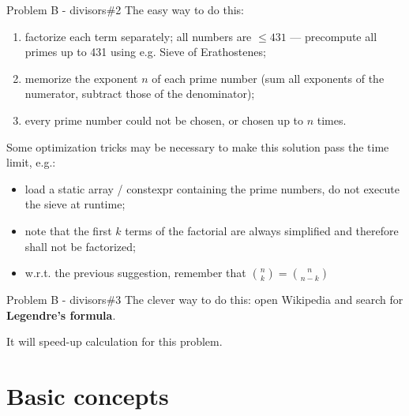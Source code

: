 \documentclass[compress]{beamer}
\begin{document}
\begin{frame}{Problem B - divisors}{\#2}
    The easy way to do this:
    \begin{enumerate}
        \item factorize each term separately; all numbers are $\leq 431$ --- precompute all primes up to 431 using e.g. Sieve of Erathostenes;
        \item memorize the exponent $n$ of each prime number (sum all exponents of the numerator, subtract those of the denominator);
        \item every prime number could not be chosen, or chosen up to $n$ times.
    \end{enumerate} \pause

    \medskip
    Some optimization tricks may be necessary to make this solution pass the time limit, e.g.:
    \begin{itemize}
        \item load a static array / constexpr containing the prime numbers, do not execute the sieve at runtime;
        \item note that the first $k$ terms of the factorial are always simplified and therefore shall not be factorized;
        \item w.r.t. the previous suggestion, remember that $\binom{n}{k} = \binom{n}{n-k}$
    \end{itemize}
\end{frame}

\begin{frame}{Problem B - divisors}{\#3}
    The clever way to do this: open Wikipedia and search for \textbf{Legendre's formula}.

    It will speed-up calculation for this problem.
\end{frame}

\section{Basic concepts}
\end{document}
